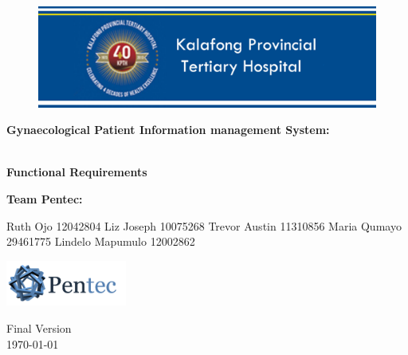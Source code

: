 \begin{titlepage}
	\begin{center}
		
		\begin{figure}[t]
			\centering
			\includegraphics[width=450px]{KPTH_Logo}
		\end{figure}		
		
		\textbf{\LARGE Gynaecological Patient Information
		management System:}
		
		\vspace{1 cm}
	    \textbf{\LARGE \\Functional Requirements}
		
		\vspace{1 cm}
		\LARGE{\textbf{Team Pentec: }}
		

		\begin{flushright} \large
			
			Ruth Ojo 12042804\newline
			Liz Joseph 10075268\newline
			Trevor Austin 11310856\newline
			Maria Qumayo 29461775\newline
			Lindelo Mapumulo 12002862\newline
		\end{flushright}
		
				\vspace{1 cm}
				\centering
				\includegraphics[width=150px]{Pentec_Logo.png}

		
		
		{\LARGE Final Version}
		\\
		{\large \today}		
		
		
	\end{center}
\end{titlepage}
